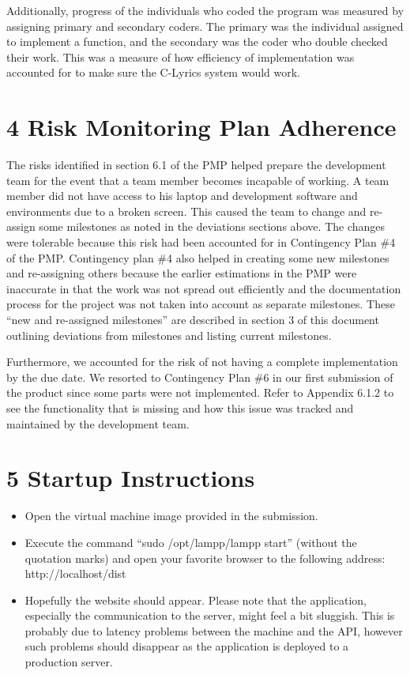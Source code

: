 \documentclass[]{article}
\begin{document}
Additionally, progress of the individuals who coded the program was
measured by assigning primary and secondary coders. The primary was the
individual assigned to implement a function, and the secondary was the
coder who double checked their work. This was a measure of how
efficiency of implementation was accounted for to make sure the C-Lyrics
system would work.

\section{4 Risk Monitoring Plan
Adherence}\label{risk-monitoring-plan-adherence}

The risks identified in section 6.1 of the PMP helped prepare the
development team for the event that a team member becomes incapable of
working. A team member did not have access to his laptop and development
software and environments due to a broken screen. This caused the team
to change and re-assign some milestones as noted in the deviations
sections above. The changes were tolerable because this risk had been
accounted for in Contingency Plan \#4 of the PMP. Contingency plan \#4
also helped in creating some new milestones and re-assigning others
because the earlier estimations in the PMP were inaccurate in that the
work was not spread out efficiently and the documentation process for
the project was not taken into account as separate milestones. These
``new and re-assigned milestones'' are described in section 3 of this
document outlining deviations from milestones and listing current
milestones.

Furthermore, we accounted for the risk of not having a complete
implementation by the due date. We resorted to Contingency Plan \#6 in
our first submission of the product since some parts were not
implemented. Refer to Appendix 6.1.2 to see the functionality that is
missing and how this issue was tracked and maintained by the development
team.

\section{5 Startup Instructions}\label{startup-instructions}

\begin{itemize}
\itemsep1pt\parskip0pt
\item
  Open the virtual machine image provided in the submission.
\item
  Execute the command ``sudo /opt/lampp/lampp start'' (without the
  quotation marks) and open your favorite browser to the following
  address: http://localhost/dist
\item
  Hopefully the website should appear. Please note that the application,
  especially the communication to the server, might feel a bit sluggish.
  This is probably due to latency problems between the machine and the
  API, however such problems should disappear as the application is
  deployed to a production server.
\end{itemize}
\end{document}

